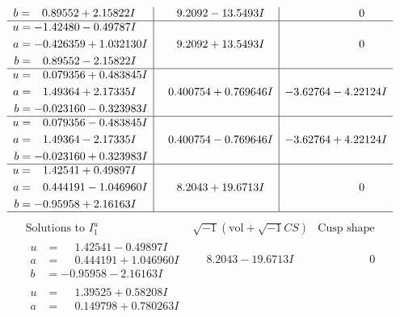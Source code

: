 \documentclass[1p]{elsarticle_modified}
\theoremstyle{definition}
\newcommand{\I}{\sqrt{-1}}
\begin{document}
$$\begin{array}{c|c|c}
\begin{aligned}
b &= \phantom{-}0.89552 + 2.15822 I\end{aligned}
 & \phantom{-}9.2092 - 13.5493 I & \phantom{-0.000000 } 0 \\ \hline\begin{aligned}
u &= -1.42480 - 0.49787 I \\
a &= -0.426359 + 1.032130 I \\
b &= \phantom{-}0.89552 - 2.15822 I\end{aligned}
 & \phantom{-}9.2092 + 13.5493 I & \phantom{-0.000000 } 0 \\ \hline\begin{aligned}
u &= \phantom{-}0.079356 + 0.483845 I \\
a &= \phantom{-}1.49364 + 2.17335 I \\
b &= -0.023160 - 0.323983 I\end{aligned}
 & \phantom{-}0.400754 + 0.769646 I & -3.62764 - 4.22124 I \\ \hline\begin{aligned}
u &= \phantom{-}0.079356 - 0.483845 I \\
a &= \phantom{-}1.49364 - 2.17335 I \\
b &= -0.023160 + 0.323983 I\end{aligned}
 & \phantom{-}0.400754 - 0.769646 I & -3.62764 + 4.22124 I \\ \hline\begin{aligned}
u &= \phantom{-}1.42541 + 0.49897 I \\
a &= \phantom{-}0.444191 - 1.046960 I \\
b &= -0.95958 + 2.16163 I\end{aligned}
 & \phantom{-}8.2043 + 19.6713 I & \phantom{-0.000000 } 0\\
 \hline 
 \end{array}$$\newpage$$\begin{array}{c|c|c}  
\text{Solutions to }I^u_{1}& \I (\text{vol} + \sqrt{-1}CS) & \text{Cusp shape}\\
 \hline 
\begin{aligned}
u &= \phantom{-}1.42541 - 0.49897 I \\
a &= \phantom{-}0.444191 + 1.046960 I \\
b &= -0.95958 - 2.16163 I\end{aligned}
 & \phantom{-}8.2043 - 19.6713 I & \phantom{-0.000000 } 0 \\ \hline\begin{aligned}
u &= \phantom{-}1.39525 + 0.58208 I \\
a &= \phantom{-}0.149798 + 0.780263 I \\

\end{aligned}
\end{array}$$
\end{document}

